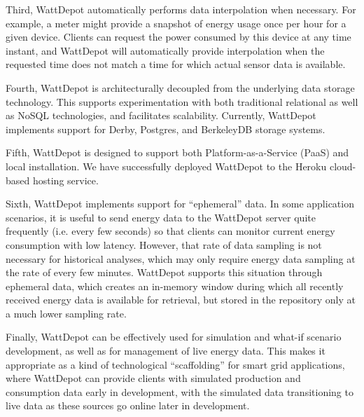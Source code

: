 Third, WattDepot automatically performs data interpolation when necessary. For example, a meter might provide a snapshot of energy usage once per hour for a given device. Clients can request the power consumed by this device at any time instant, and WattDepot will automatically provide interpolation when the requested time does not match a time for which actual sensor data is available.

Fourth, WattDepot is architecturally decoupled from the underlying data storage technology. This supports experimentation with both traditional relational as well as NoSQL technologies, and facilitates scalability. Currently, WattDepot implements support for Derby, Postgres, and BerkeleyDB storage systems.

Fifth, WattDepot is designed to support both Platform-as-a-Service (PaaS) and local installation. We have successfully deployed WattDepot to the Heroku cloud-based hosting service.

Sixth, WattDepot implements support for ``ephemeral'' data. In some application scenarios, it is useful to send energy data to the WattDepot server quite frequently (i.e. every few seconds) so that clients can monitor current energy consumption with low latency. However, that rate of data sampling is not necessary for historical analyses, which may only require energy data sampling at the rate of every few minutes. WattDepot supports this situation through ephemeral data, which creates an in-memory window during which all recently received energy data is available for retrieval, but stored in the repository only at a much lower sampling rate.

Finally, WattDepot can be effectively used for simulation and what-if scenario development, as well as for management of live energy data.  This makes it appropriate as a kind of technological ``scaffolding'' for smart grid applications, where WattDepot can provide clients with simulated production and consumption data early in development, with the simulated data transitioning to live data as these sources go online later in development.
